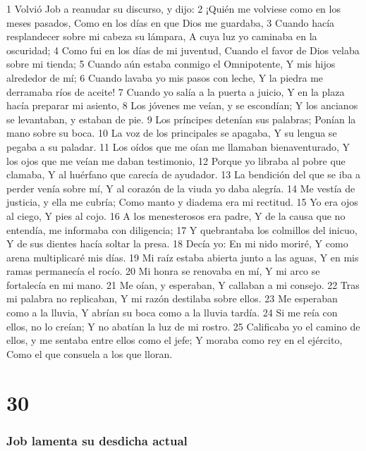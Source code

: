 1 Volvió Job a reanudar su discurso, y dijo:  
2 ¡Quién me volviese como en los meses pasados,  
Como en los días en que Dios me guardaba,  
3 Cuando hacía resplandecer sobre mi cabeza su lámpara,  
A cuya luz yo caminaba en la oscuridad;  
4 Como fui en los días de mi juventud,  
Cuando el favor de Dios velaba sobre mi tienda; 
5 Cuando aún estaba conmigo el Omnipotente,  
Y mis hijos alrededor de mí;  
6 Cuando lavaba yo mis pasos con leche,  
Y la piedra me derramaba ríos de aceite!  
7 Cuando yo salía a la puerta a juicio,  
Y en la plaza hacía preparar mi asiento,  
8 Los jóvenes me veían, y se escondían;  
Y los ancianos se levantaban, y estaban de pie.  
9 Los príncipes detenían sus palabras;  
Ponían la mano sobre su boca. 
10 La voz de los principales se apagaba,  
Y su lengua se pegaba a su paladar.  
11 Los oídos que me oían me llamaban bienaventurado,  
Y los ojos que me veían me daban testimonio,  
12 Porque yo libraba al pobre que clamaba,  
Y al huérfano que carecía de ayudador.  
13 La bendición del que se iba a perder venía sobre mí,  
Y al corazón de la viuda yo daba alegría.  
14 Me vestía de justicia, y ella me cubría;  
Como manto y diadema era mi rectitud. 
15 Yo era ojos al ciego,  
Y pies al cojo.  
16 A los menesterosos era padre,  
Y de la causa que no entendía, me informaba con diligencia;  
17 Y quebrantaba los colmillos del inicuo,  
Y de sus dientes hacía soltar la presa.  
18 Decía yo: En mi nido moriré,  
Y como arena multiplicaré mis días.  
19 Mi raíz estaba abierta junto a las aguas,  
Y en mis ramas permanecía el rocío.  
20 Mi honra se renovaba en mí,  
Y mi arco se fortalecía en mi mano.  
21 Me oían, y esperaban,  
Y callaban a mi consejo.  
22 Tras mi palabra no replicaban, 
Y mi razón destilaba sobre ellos.  
23 Me esperaban como a la lluvia,  
Y abrían su boca como a la lluvia tardía.  
24 Si me reía con ellos, no lo creían;  
Y no abatían la luz de mi rostro.  
25 Calificaba yo el camino de ellos, y me sentaba entre ellos como el jefe;  
Y moraba como rey en el ejército,  
Como el que consuela a los que lloran.  

\chapter{30}

\subsection*{Job lamenta su desdicha actual}  

